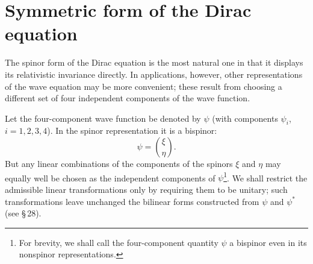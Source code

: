 \section{Symmetric form of the Dirac equation}

The spinor form of the Dirac equation is the most natural one in that it displays its relativistic invariance directly. In applications, however, other representations of the wave equation may be more convenient; these result from choosing a different set of four independent components of the wave function.

Let the four-component wave function be denoted by $\psi$ (with components $\psi_i$, $i = 1, 2, 3, 4$). In the spinor representation it is a bispinor:
\begin{equation}
\psi = \binom{\xi}{\eta}.
\tag{21.1}
\end{equation}
But any linear combinations of the components of the spinors $\xi$ and $\eta$ may equally well be chosen as the independent components of $\psi$\footnote{For brevity, we shall call the four-component quantity $\psi$ a bispinor even in its nonspinor representations.}. We shall restrict the admissible linear transformations only by requiring them to be unitary; such transformations leave unchanged the bilinear forms constructed from $\psi$ and $\psi^*$ (see \S\,28).

